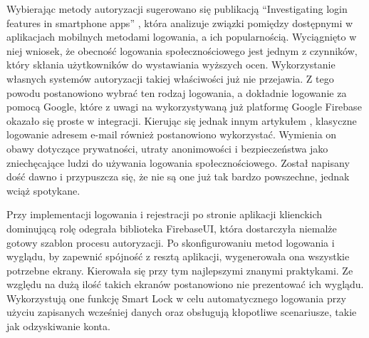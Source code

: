 Wybierając metody autoryzacji sugerowano się publikacją \enquote{Investigating login features in smartphone apps} \cite{login-methods}, która analizuje związki pomiędzy dostępnymi w aplikacjach mobilnych metodami logowania, a ich popularnością. Wyciągnięto w niej wniosek, że obecność logowania społecznościowego jest jednym z czynników, który skłania użytkowników do wystawiania wyższych ocen. Wykorzystanie własnych systemów autoryzacji takiej właściwości już nie przejawia. Z tego powodu postanowiono wybrać ten rodzaj logowania, a dokładnie logowanie za pomocą Google, które z uwagi na wykorzystywaną już platformę Google Firebase okazało się proste w integracji. Kierując się jednak innym artykułem \cite{social-login}, klasyczne logowanie adresem e-mail również postanowiono wykorzystać. Wymienia on obawy dotyczące prywatności, utraty anonimowości i bezpieczeństwa jako zniechęcające ludzi do używania logowania społecznościowego. Został napisany dość dawno i przypuszcza się, że nie są one już tak bardzo powszechne, jednak wciąż spotykane.

Przy implementacji logowania i rejestracji po stronie aplikacji klienckich dominującą rolę odegrała biblioteka FirebaseUI, która dostarczyła niemalże gotowy szablon procesu autoryzacji. Po skonfigurowaniu metod logowania i wyglądu, by zapewnić spójność z resztą aplikacji, wygenerowała ona wszystkie potrzebne ekrany. Kierowała się przy tym najlepszymi znanymi praktykami. Ze względu na dużą ilość takich ekranów postanowiono nie prezentować ich wyglądu. Wykorzystują one funkcję Smart Lock w celu automatycznego logowania przy użyciu zapisanych wcześniej danych oraz obsługują kłopotliwe scenariusze, takie jak odzyskiwanie konta.

